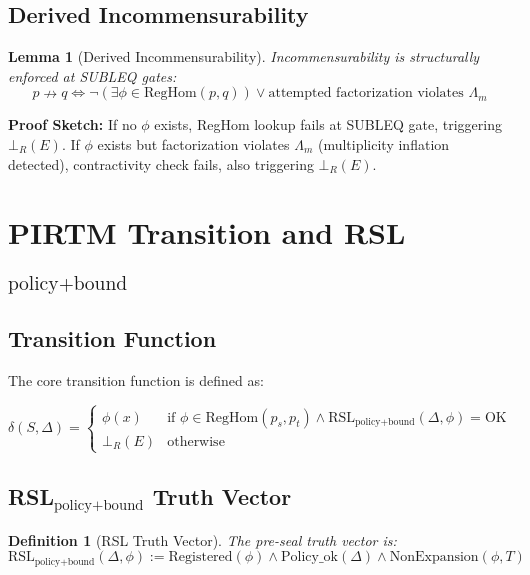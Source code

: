 \documentclass[11pt,a4paper]{article}
\newtheorem{definition}[theorem]{Definition}
\newtheorem{lemma}[theorem]{Lemma}
\begin{document}
\subsection{Derived Incommensurability}

\begin{lemma}[Derived Incommensurability]\label{lemma:incommensurability}
Incommensurability is structurally enforced at SUBLEQ gates:
$$p \nrightarrow q \iff \neg(\exists \phi \in \text{RegHom}(p,q)) \lor \text{attempted factorization violates } \Lambda_m$$
\end{lemma}

\textbf{Proof Sketch:} If no $\phi$ exists, RegHom lookup fails at SUBLEQ gate, triggering $\bot_R(E)$. If $\phi$ exists but factorization violates $\Lambda_m$ (multiplicity inflation detected), contractivity check fails, also triggering $\bot_R(E)$.

\section{PIRTM Transition and RSL$_{\text{policy+bound}}$}

\subsection{Transition Function}

The core transition function is defined as:

\begin{equation}\label{eq:transition}
\delta(S, \Delta) =
\begin{cases}
\phi(x) & \text{if } \phi \in \text{RegHom}(p_s, p_t) \land \text{RSL}_{\text{policy+bound}}(\Delta, \phi) = \text{OK} \\
\bot_R(E) & \text{otherwise}
\end{cases}
\end{equation}

\subsection{RSL$_{\text{policy+bound}}$ Truth Vector}

\begin{definition}[RSL Truth Vector]\label{def:rsl}
The pre-seal truth vector is:
$$\text{RSL}_{\text{policy+bound}}(\Delta, \phi) := \text{Registered}(\phi) \land \text{Policy\_ok}(\Delta) \land \text{NonExpansion}(\phi, T)$$
\end{definition}
\end{document}
